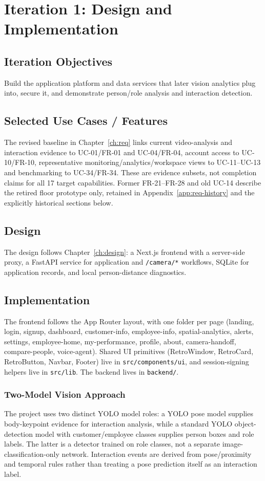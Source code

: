 \chapter{Iteration 1: Design and Implementation}
\label{ch:iter1}
\section{Iteration Objectives}
Build the application platform and data services that later vision analytics plug into, secure it, and demonstrate person/role analysis and interaction detection.

\section{Selected Use Cases / Features}
The revised baseline in Chapter~\ref{ch:req} links current video-analysis and interaction evidence to UC-01/FR-01 and UC-04/FR-04, account access to UC-10/FR-10, representative monitoring/analytics/workspace views to UC-11--UC-13 and benchmarking to UC-34/FR-34. These are evidence subsets, not completion claims for all 17 target capabilities. Former FR-21--FR-28 and old UC-14 describe the retired floor prototype only, retained in Appendix~\ref{app:req-history} and the explicitly historical sections below.

\section{Design}
The design follows Chapter~\ref{ch:design}: a Next.js frontend with a server-side proxy, a FastAPI service for application and \texttt{/camera/*} workflows, SQLite for application records, and local person-distance diagnostics.

\section{Implementation}
The frontend follows the App Router layout, with one folder per page (landing, login, signup, dashboard, customer-info, employee-info, spatial-analytics, alerts, settings, employee-home, my-performance, profile, about, camera-handoff, compare-people, voice-agent). Shared UI primitives (RetroWindow, RetroCard, RetroButton, Navbar, Footer) live in \texttt{src/components/ui}, and session-signing helpers live in \texttt{src/lib}. The backend lives in \texttt{backend/}.

\subsection{Two-Model Vision Approach}
The project uses two distinct YOLO model roles: a YOLO pose model supplies body-keypoint evidence for interaction analysis, while a standard YOLO object-detection model with customer/employee classes supplies person boxes and role labels. The latter is a detector trained on role classes, not a separate image-classification-only network. Interaction events are derived from pose/proximity and temporal rules rather than treating a pose prediction itself as an interaction label.

